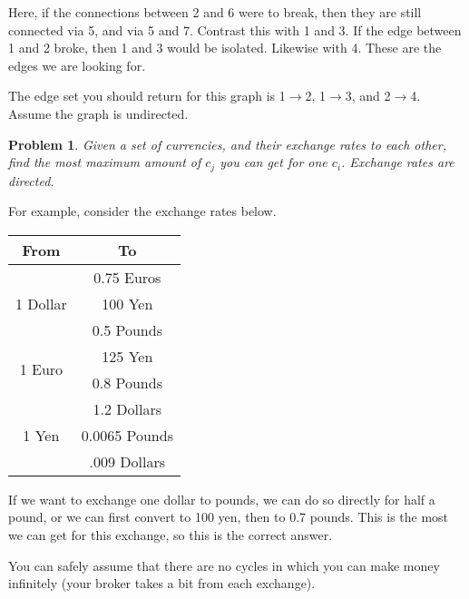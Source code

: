 \documentclass{article}
\newtheorem{problem}{Problem}
\begin{document}
Here, if the connections between 2 and 6 were to break, then they are still connected via 5, and via 5 and 7.  Contrast this with 1 and 3.  If the edge between 1 and 2 broke, then 1 and 3 would be isolated.  Likewise with 4.  These are the edges we are looking for.

The edge set you should return for this graph is 1$\rightarrow$2, 1$\rightarrow$3, and 2$\rightarrow$4.  Assume the graph is undirected.

\begin{problem}
Given a set of currencies, and their exchange rates to each other, find the most maximum amount of $c_j$ you can get for one $c_i$.  Exchange rates are directed.
\end{problem}

For example, consider the exchange rates below.

\begin{center}
\begin{tabular}{|c|c|}
\hline
From & To \\
\hline
\multirow{3}{*}{1 Dollar} & 0.75 Euros \\
& 100 Yen \\
& 0.5 Pounds \\
\hline
\multirow{2}{*}{1 Euro} & 125 Yen \\
& 0.8 Pounds \\
& 1.2 Dollars \\
\hline
1 Yen & 0.0065 Pounds \\
& .009 Dollars \\
\hline
\end{tabular}
\end{center}

If we want to exchange one dollar to pounds, we can do so directly for half a pound, or we can first convert to 100 yen, then to 0.7 pounds.  This is the most we can get for this exchange, so this is the correct answer.

You can safely assume that there are no cycles in which you can make money infinitely (your broker takes a bit from each exchange).
\end{document}
